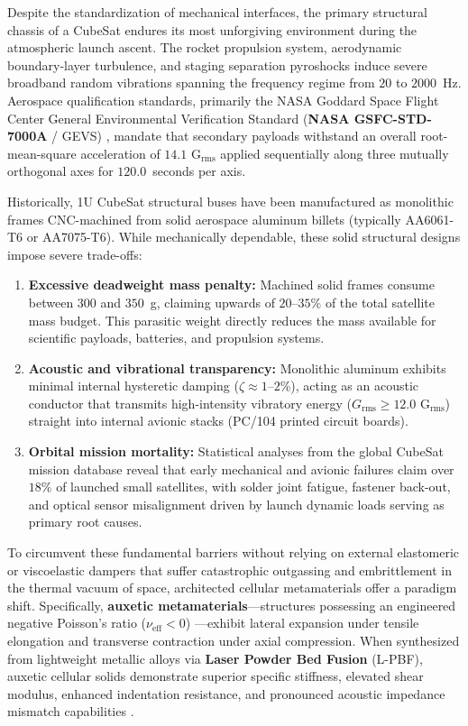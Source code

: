 \documentclass[preprint,12pt,3p]{elsarticle}
\begin{document}
Despite the standardization of mechanical interfaces, the primary structural chassis of a CubeSat endures its most unforgiving environment during the atmospheric launch ascent. The rocket propulsion system, aerodynamic boundary-layer turbulence, and staging separation pyroshocks induce severe broadband random vibrations spanning the frequency regime from $20$ to $2000$~Hz. Aerospace qualification standards, primarily the NASA Goddard Space Flight Center General Environmental Verification Standard (\textbf{NASA GSFC-STD-7000A} / GEVS) \cite{nasa2013}, mandate that secondary payloads withstand an overall root-mean-square acceleration of $14.1\text{ G}_{\text{rms}}$ applied sequentially along three mutually orthogonal axes for $120.0$~seconds per axis.

Historically, 1U CubeSat structural buses have been manufactured as monolithic frames CNC-machined from solid aerospace aluminum billets (typically AA6061-T6 or AA7075-T6). While mechanically dependable, these solid structural designs impose severe trade-offs:
\begin{enumerate}
  \item \textbf{Excessive deadweight mass penalty:} Machined solid frames consume between $300$ and $350$~g, claiming upwards of $20\text{--}35\%$ of the total satellite mass budget. This parasitic weight directly reduces the mass available for scientific payloads, batteries, and propulsion systems.
  \item \textbf{Acoustic and vibrational transparency:} Monolithic aluminum exhibits minimal internal hysteretic damping ($\zeta \approx 1\text{--}2\%$), acting as an acoustic conductor that transmits high-intensity vibratory energy ($G_{\text{rms}} \ge 12.0\text{ G}_{\text{rms}}$) straight into internal avionic stacks (PC/104 printed circuit boards).
  \item \textbf{Orbital mission mortality:} Statistical analyses from the global CubeSat mission database \cite{swartwout2023} reveal that early mechanical and avionic failures claim over $18\%$ of launched small satellites, with solder joint fatigue, fastener back-out, and optical sensor misalignment driven by launch dynamic loads serving as primary root causes.
\end{enumerate}

To circumvent these fundamental barriers without relying on external elastomeric or viscoelastic dampers that suffer catastrophic outgassing and embrittlement in the thermal vacuum of space, architected cellular metamaterials offer a paradigm shift. Specifically, \textbf{auxetic metamaterials}—structures possessing an engineered negative Poisson's ratio ($\nu_{\text{eff}} < 0$) \cite{lakes1987,gibson1997}—exhibit lateral expansion under tensile elongation and transverse contraction under axial compression. When synthesized from lightweight metallic alloys via \textbf{Laser Powder Bed Fusion} (L-PBF), auxetic cellular solids demonstrate superior specific stiffness, elevated shear modulus, enhanced indentation resistance, and pronounced acoustic impedance mismatch capabilities \cite{hussein2014,collini2024}.
\end{document}
